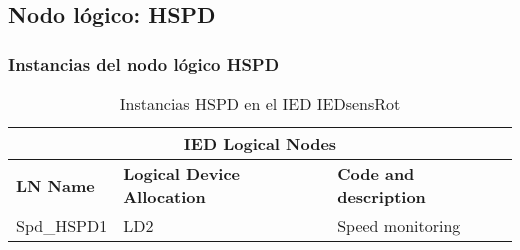
\subsection{Nodo l\'ogico: 			 HSPD}

    \subsubsection{Instancias del nodo l\'ogico HSPD}
    \begin{table}[H]
    \begin{center}
    \begin{tabular}{|l|l|p{6.8cm}|}
            \hline
            \multicolumn{3}{|c|}{\cellcolor[gray]{0.8} \textbf{IED Logical Nodes} } \\
            \hline
            \textbf{LN Name} & \textbf{Logical Device Allocation} & \textbf{Code and description} \\
            \hline
            Spd\_HSPD1 & LD2 & Speed monitoring \\
            \hline
    \end{tabular}
    \caption{Instancias HSPD en el IED IEDsensRot}
    \label{table:lnInstHSPD_1}
    \end{center}
    \end{table}
    
    
    
